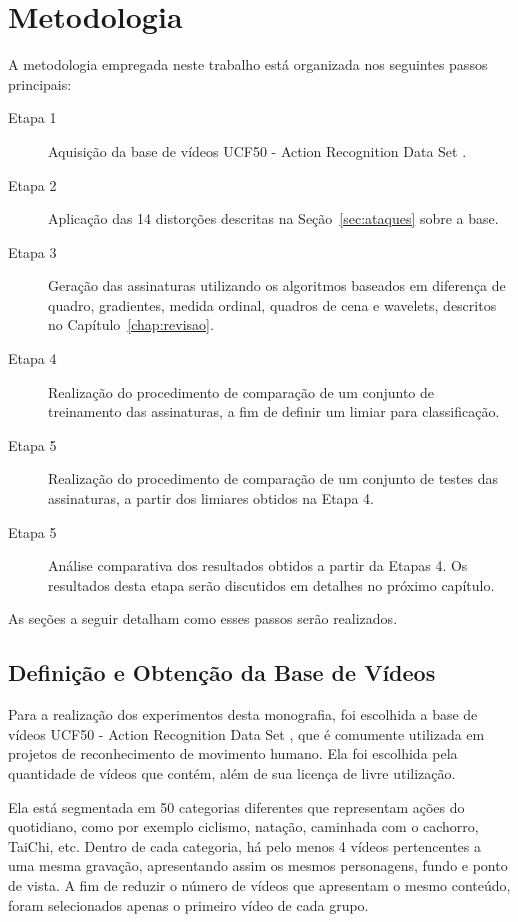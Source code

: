
\chapter{Metodologia}
\label{chap:metodologia}


A metodologia empregada neste trabalho está organizada nos seguintes passos principais:

\begin{description}
\item[Etapa 1] Aquisição da base de vídeos UCF50 - Action Recognition Data Set \citeauthor{reddy2013recognizing}.
\item[Etapa 2] Aplicação das 14 distorções descritas na Seção~\ref{sec:ataques} sobre a base.
\item[Etapa 3] Geração das assinaturas utilizando os algoritmos baseados em diferença de quadro, gradientes, medida ordinal, quadros de cena e wavelets, descritos no Capítulo~\ref{chap:revisao}.
\item[Etapa 4] Realização do procedimento de comparação de um conjunto de treinamento das assinaturas, a fim de definir um limiar para classificação.
\item[Etapa 5] Realização do procedimento de comparação de um conjunto de testes das assinaturas, a partir dos limiares obtidos na Etapa 4.
\item[Etapa 5] Análise comparativa dos resultados obtidos a partir da Etapas 4. Os resultados desta etapa serão discutidos em detalhes no próximo capítulo.
\end{description}

As seções a seguir detalham como esses passos serão realizados.

\section{Definição e Obtenção da Base de Vídeos}
\label{sec:database}

Para a realização dos experimentos desta monografia, foi escolhida a base de vídeos UCF50 - Action Recognition Data Set \citeauthor{reddy2013recognizing}, que é comumente utilizada em projetos de reconhecimento de movimento humano. Ela foi escolhida pela quantidade de vídeos que contém, além de sua licença de livre utilização.

Ela está segmentada em 50 categorias diferentes que representam ações do quotidiano, como por exemplo ciclismo, natação, caminhada com o cachorro, TaiChi, etc. Dentro de cada categoria, há pelo menos 4 vídeos pertencentes a uma mesma gravação, apresentando assim os mesmos personagens, fundo e ponto de vista. A fim de reduzir o número de vídeos que apresentam o mesmo conteúdo, foram selecionados apenas o primeiro vídeo de cada grupo.

